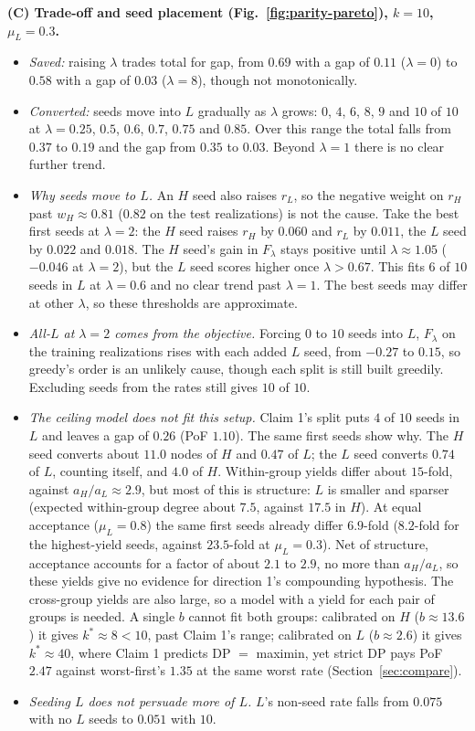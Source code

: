 \textbf{(C) Trade-off and seed placement (Fig.~\ref{fig:parity-pareto}), $k=10$, $\mu_L=0.3$.}
\begin{itemize}
\item \emph{Saved:} raising $\lambda$ trades total for gap, from $0.69$ with a gap of $0.11$ ($\lambda=0$) to $0.58$ with a gap of $0.03$ ($\lambda=8$), though not monotonically.
\item \emph{Converted:} seeds move into $L$ gradually as $\lambda$ grows: $0$, $4$, $6$, $8$, $9$ and $10$ of $10$ at $\lambda=0.25$, $0.5$, $0.6$, $0.7$, $0.75$ and $0.85$. Over this range the total falls from $0.37$ to $0.19$ and the gap from $0.35$ to $0.03$. Beyond $\lambda=1$ there is no clear further trend.
\item \emph{Why seeds move to $L$.} An $H$ seed also raises $r_L$, so the negative weight on $r_H$ past $w_H\approx0.81$ ($0.82$ on the test realizations) is not the cause. Take the best first seeds at $\lambda=2$: the $H$ seed raises $r_H$ by $0.060$ and $r_L$ by $0.011$, the $L$ seed by $0.022$ and $0.018$. The $H$ seed's gain in $F_\lambda$ stays positive until $\lambda\approx1.05$ ($-0.046$ at $\lambda=2$), but the $L$ seed scores higher once $\lambda>0.67$. This fits $6$ of $10$ seeds in $L$ at $\lambda=0.6$ and no clear trend past $\lambda=1$. The best seeds may differ at other $\lambda$, so these thresholds are approximate.
\item \emph{All-$L$ at $\lambda=2$ comes from the objective.} Forcing $0$ to $10$ seeds into $L$, $F_\lambda$ on the training realizations rises with each added $L$ seed, from $-0.27$ to $0.15$, so greedy's order is an unlikely cause, though each split is still built greedily. Excluding seeds from the rates still gives $10$ of $10$.
\item \emph{The ceiling model does not fit this setup.} Claim 1's split puts $4$ of $10$ seeds in $L$ and leaves a gap of $0.26$ (PoF $1.10$). The same first seeds show why. The $H$ seed converts about $11.0$ nodes of $H$ and $0.47$ of $L$; the $L$ seed converts $0.74$ of $L$, counting itself, and $4.0$ of $H$. Within-group yields differ about $15$-fold, against $a_H/a_L\approx2.9$, but most of this is structure: $L$ is smaller and sparser (expected within-group degree about $7.5$, against $17.5$ in $H$). At equal acceptance ($\mu_L=0.8$) the same first seeds already differ $6.9$-fold ($8.2$-fold for the highest-yield seeds, against $23.5$-fold at $\mu_L=0.3$). Net of structure, acceptance accounts for a factor of about $2.1$ to $2.9$, no more than $a_H/a_L$, so these yields give no evidence for direction 1's compounding hypothesis. The cross-group yields are also large, so a model with a yield for each pair of groups is needed. A single $b$ cannot fit both groups: calibrated on $H$ ($b\approx13.6$) it gives $k^*\approx8<10$, past Claim 1's range; calibrated on $L$ ($b\approx2.6$) it gives $k^*\approx40$, where Claim 1 predicts DP $=$ maximin, yet strict DP pays PoF $2.47$ against worst-first's $1.35$ at the same worst rate (Section~\ref{sec:compare}).
\item \emph{Seeding $L$ does not persuade more of $L$.} $L$'s non-seed rate falls from $0.075$ with no $L$ seeds to $0.051$ with $10$.
\end{itemize}

